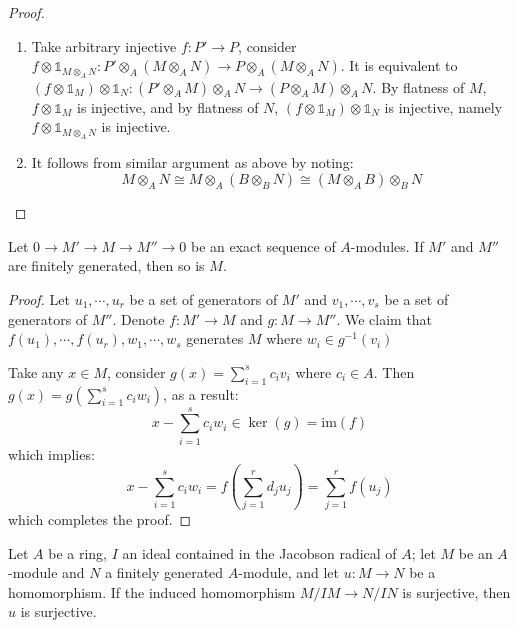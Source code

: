 \documentclass{solution}
\begin{document}
\begin{proof}
    \begin{enumerate}
        \item Take arbitrary injective $f: P' \rightarrow P$, consider $f \otimes \mathds{1}_{M \otimes_A N}: P' \otimes_A (M \otimes_A N) \rightarrow P \otimes_{A} (M \otimes_A N)$. It is equivalent to $(f \otimes \mathds{1}_{M}) \otimes \mathds{1}_N: (P' \otimes_A M) \otimes_A N \rightarrow (P \otimes_{A} M) \otimes_A N$. By flatness of $M$, $f \otimes \mathds{1}_M$ is injective, and by flatness of $N$, $(f \otimes \mathds{1}_{M}) \otimes \mathds{1}_N$ is injective, namely $f \otimes \mathds{1}_{M \otimes_A N}$ is injective.
        \item It follows from similar argument as above by noting:
        $$M \otimes_A N \cong M \otimes_A (B \otimes_B N) \cong (M \otimes_A B) \otimes_B N$$
    \end{enumerate}
\end{proof}

\begin{problem}
    Let $0 \rightarrow M' \rightarrow M \rightarrow M'' \rightarrow 0$ be an exact sequence of $A$-modules. If $M'$ and $M''$ are finitely generated, then so is $M$.
\end{problem}

\begin{proof}
    Let $u_1, \cdots, u_r$ be a set of generators of $M'$ and $v_1, \cdots, v_s$ be a set of generators of $M''$. Denote $f: M' \rightarrow M$ and $g: M \rightarrow M''$. We claim that $f(u_1), \cdots, f(u_r), w_1, \cdots, w_s$ generates $M$ where $w_i \in g ^{-1} (v_i)$

    Take any $x \in M$, consider $g(x) = \sum\limits_{i = 1}^{s} c_i v_i$ where $c_i \in A$. Then $g(x) = g(\sum\limits_{i = 1}^{s} c_i w_i)$, as a result:
    $$x - \sum\limits_{i = 1}^{s} c_iw_i \in \ker (g) = \mathrm{im}(f)$$
    which implies:
    $$x - \sum\limits_{i = 1}^{s} c_iw_i = f(\sum\limits_{j = 1}^{r} d_ju_j) = \sum\limits_{j = 1}^{r} f(u_j)$$
    which completes the proof.
\end{proof}

\begin{problem}
    Let $A$ be a ring, $I$ an ideal contained in the Jacobson radical of $A$; let $M$ be an $A$-module and $N$ a finitely generated $A$-module, and let $u: M \rightarrow N$ be a homomorphism. If the induced homomorphism $M / IM \rightarrow N / IN$ is surjective, then $u$ is surjective.
\end{problem}
\end{document}

